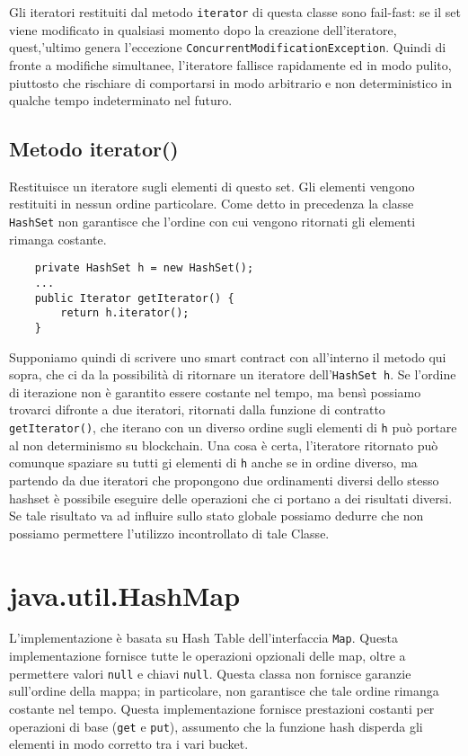 		Gli iteratori restituiti dal metodo \lstinline|iterator| di questa classe sono fail-fast: se il set viene modificato in qualsiasi momento dopo la creazione dell'iteratore, quest,'ultimo genera l'eccezione \lstinline|ConcurrentModificationException|. Quindi di fronte a modifiche simultanee, l'iteratore fallisce rapidamente ed in modo pulito, piuttosto che rischiare di comportarsi in modo arbitrario e non deterministico in qualche tempo indeterminato nel futuro.
		
		
		\subsection{Metodo iterator()}
			Restituisce un iteratore sugli elementi di questo set. Gli elementi vengono restituiti in nessun ordine particolare. Come detto in precedenza la classe \lstinline|HashSet| non garantisce che l'ordine con cui vengono ritornati gli elementi rimanga costante.
			\begin{lstlisting}
	private HashSet h = new HashSet(); 
	...
	public Iterator getIterator() { 
		return h.iterator();
	}
			\end{lstlisting}
			Supponiamo quindi di scrivere uno smart contract con all'interno il metodo qui sopra, che ci da la possibilità di ritornare un iteratore dell'\lstinline|HashSet h|. Se l'ordine di iterazione non è garantito essere costante nel tempo, ma bensì possiamo trovarci difronte a due iteratori, ritornati dalla funzione di contratto \lstinline|getIterator()|, che iterano con un diverso ordine sugli elementi di \lstinline|h| può portare al non determinismo su blockchain. Una cosa è certa, l'iteratore ritornato può comunque spaziare su tutti gi elementi di \lstinline|h| anche se in ordine diverso, ma partendo da due iteratori che propongono due ordinamenti diversi dello stesso hashset è possibile eseguire delle operazioni che ci portano a dei risultati diversi. Se tale risultato va ad influire sullo stato globale possiamo dedurre che non possiamo permettere l'utilizzo incontrollato di tale Classe.
					
	\section{java.util.HashMap}
		L'implementazione è basata su Hash Table dell'interfaccia \lstinline|Map|. Questa implementazione fornisce tutte le operazioni opzionali delle map, oltre a permettere valori \lstinline|null| e chiavi \lstinline|null|. Questa classa non fornisce garanzie sull'ordine della mappa; in particolare, non garantisce che tale ordine rimanga costante nel tempo. Questa implementazione fornisce prestazioni costanti per operazioni di base (\lstinline|get| e \lstinline|put|), assumento che la funzione hash disperda gli elementi in modo corretto tra i vari bucket.
			
